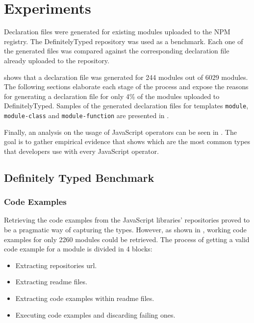 \chapter{Experiments}\label{chap:experiments}
Declaration files were generated for existing modules uploaded to the NPM registry. The DefinitelyTyped repository was used as a benchmark. Each one of the generated files was compared against the corresponding declaration file already uploaded to the repository.

 shows that a declaration file was generated for 244 modules out of 6029 modules. The following sections elaborate each stage of the process and expose the reasons for generating a declaration file for only 4\% of the modules uploaded to DefinitelyTyped. Samples of the generated declaration files for templates \texttt{module}, \texttt{module-class} and \texttt{module-function} are presented in .



Finally, an analysis on the usage of JavaScript operators can be seen in . The goal is to gather empirical evidence that shows which are the most common types that developers use with every JavaScript operator.

\section{Definitely Typed Benchmark}

\subsection{Code Examples}
Retrieving the code examples from the JavaScript libraries' repositories proved to be a pragmatic way of capturing the types. However, as shown in , working code examples for only 2260 modules could be retrieved. The process of getting a valid code example for a module is divided in 4 blocks:
\begin{itemize}
	\item Extracting repositories url.
	\item Extracting readme files.
	\item Extracting code examples within readme files.
	\item Executing code examples and discarding failing ones.
\end{itemize}

